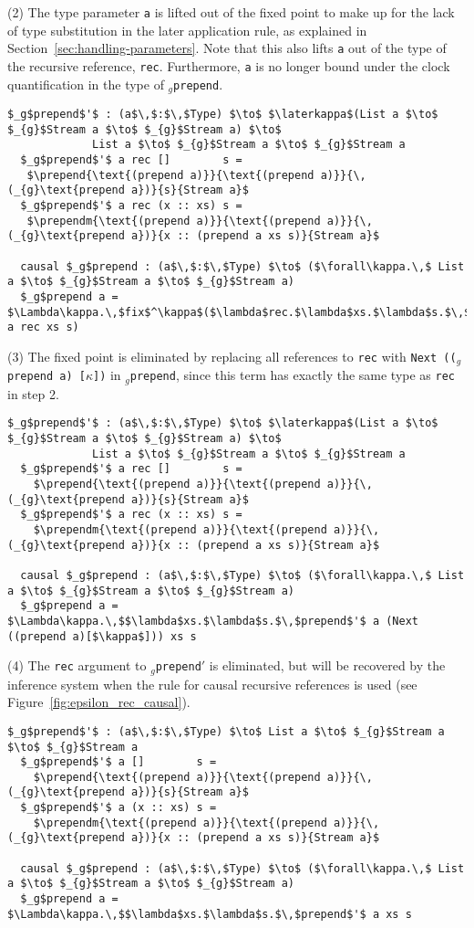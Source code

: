 (2) The type parameter \texttt{a} is lifted out of the fixed point to make up
for the lack of type substitution in the later application rule, as explained in
Section~\ref{sec:handling-parameters}. Note that this also lifts \texttt{a} out
of the type of the recursive reference, \texttt{rec}. Furthermore, \texttt{a} is
no longer bound under the clock quantification in the type of \texttt{$_g$prepend}.
\begin{lstlisting}[mathescape]
  $_g$prepend$'$ : (a$\,$:$\,$Type) $\to$ $\laterkappa$(List a $\to$ $_{g}$Stream a $\to$ $_{g}$Stream a) $\to$ 
             List a $\to$ $_{g}$Stream a $\to$ $_{g}$Stream a
  $_g$prepend$'$ a rec []        s =
   $\prepend{\text{(prepend a)}}{\text{(prepend a)}}{\,(_{g}\text{prepend a})}{s}{Stream a}$
  $_g$prepend$'$ a rec (x :: xs) s =
   $\prependm{\text{(prepend a)}}{\text{(prepend a)}}{\,(_{g}\text{prepend a})}{x :: (prepend a xs s)}{Stream a}$

  causal $_g$prepend : (a$\,$:$\,$Type) $\to$ ($\forall\kappa.\,$ List a $\to$ $_{g}$Stream a $\to$ $_{g}$Stream a)
  $_g$prepend a = $\Lambda\kappa.\,$fix$^\kappa$($\lambda$rec.$\lambda$xs.$\lambda$s.$\,$prepend$'$ a rec xs s)
\end{lstlisting}
(3) The fixed point is eliminated by replacing all references to
\texttt{rec} with \texttt{Next~(($_g$prepend~a)~[$\kappa$])} in \texttt{$_g$prepend}, since this term has
exactly the same type as \texttt{rec} in step 2.
\begin{lstlisting}[mathescape]
  $_g$prepend$'$ : (a$\,$:$\,$Type) $\to$ $\laterkappa$(List a $\to$ $_{g}$Stream a $\to$ $_{g}$Stream a) $\to$ 
             List a $\to$ $_{g}$Stream a $\to$ $_{g}$Stream a
  $_g$prepend$'$ a rec []        s =
    $\prepend{\text{(prepend a)}}{\text{(prepend a)}}{\,(_{g}\text{prepend a})}{s}{Stream a}$
  $_g$prepend$'$ a rec (x :: xs) s =
    $\prependm{\text{(prepend a)}}{\text{(prepend a)}}{\,(_{g}\text{prepend a})}{x :: (prepend a xs s)}{Stream a}$

  causal $_g$prepend : (a$\,$:$\,$Type) $\to$ ($\forall\kappa.\,$ List a $\to$ $_{g}$Stream a $\to$ $_{g}$Stream a)
  $_g$prepend a = $\Lambda\kappa.\,$$\lambda$xs.$\lambda$s.$\,$prepend$'$ a (Next ((prepend a)[$\kappa$])) xs s
\end{lstlisting}
(4) The \texttt{rec} argument to \texttt{$_g$prepend$'$} is eliminated, but will
be recovered by the inference system when the rule for causal recursive
references is used (see Figure~\ref{fig:epsilon_rec_causal}).
\begin{lstlisting}[mathescape]
  $_g$prepend$'$ : (a$\,$:$\,$Type) $\to$ List a $\to$ $_{g}$Stream a $\to$ $_{g}$Stream a
  $_g$prepend$'$ a []        s =
    $\prepend{\text{(prepend a)}}{\text{(prepend a)}}{\,(_{g}\text{prepend a})}{s}{Stream a}$
  $_g$prepend$'$ a (x :: xs) s =
    $\prependm{\text{(prepend a)}}{\text{(prepend a)}}{\,(_{g}\text{prepend a})}{x :: (prepend a xs s)}{Stream a}$

  causal $_g$prepend : (a$\,$:$\,$Type) $\to$ ($\forall\kappa.\,$ List a $\to$ $_{g}$Stream a $\to$ $_{g}$Stream a)
  $_g$prepend a = $\Lambda\kappa.\,$$\lambda$xs.$\lambda$s.$\,$prepend$'$ a xs s
\end{lstlisting}
